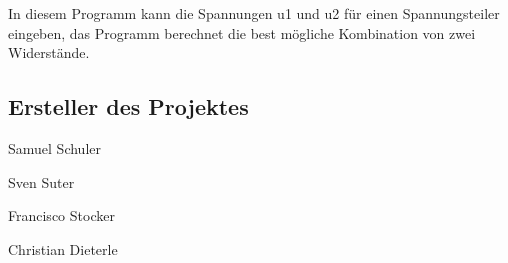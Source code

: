 In diesem Programm kann die Spannungen u1 und u2 für einen Spannungsteiler eingeben, das Programm berechnet die best mögliche Kombination von zwei Widerstände.

\subsection*{Ersteller des Projektes}


\begin{DoxyItemize}
\item Samuel Schuler
\item Sven Suter
\item Francisco Stocker
\item Christian Dieterle 
\end{DoxyItemize}